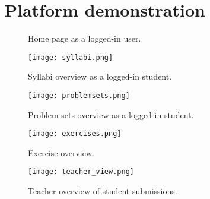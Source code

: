 \chapter{Platform demonstration} \label{chap:images}
\begin{figure}[H]
    \centering
    \caption{Home page as a logged-in user.}
    \label{fig:Home page}
\end{figure}

\begin{figure}[H]
    \centering
    \texttt{[image: syllabi.png]}
    \caption{Syllabi overview as a logged-in student.}
    \label{fig:syllabi}
\end{figure}

\begin{figure}[H]
    \centering
    \texttt{[image: problemsets.png]}
    \caption{Problem sets overview as a logged-in student.}
    \label{fig:problemsets}
\end{figure}

\begin{figure}[H]
    \centering
    \texttt{[image: exercises.png]}
    \caption{Exercise overview.}
    \label{fig:exercise_overview}
\end{figure}

\begin{figure}[H]
    \centering
    \texttt{[image: teacher\_view.png]}
    \caption{Teacher overview of student submissions.}
    \label{fig:teacher_overview.}
\end{figure}